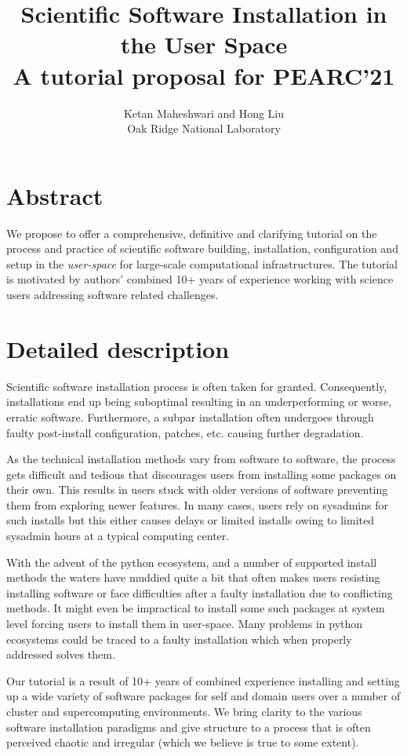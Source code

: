 \documentclass{report}
\title{Scientific Software Installation in the User Space\\
       \large A tutorial proposal for PEARC'21
			 }
\author{Ketan Maheshwari and Hong Liu\\ Oak Ridge National Laboratory}
\begin{document}
\maketitle
\section*{Abstract}
We propose to offer a comprehensive, definitive and clarifying tutorial on the
process and practice of scientific software building, installation,
configuration and setup in the \emph{user-space} for large-scale computational
infrastructures. The tutorial is motivated by authors' combined 10+ years of
experience working with science users addressing software related challenges.

\section*{Detailed description}
Scientific software installation process is often taken for granted.
Consequently, installations end up being suboptimal resulting in an underperforming
or worse, erratic software. Furthermore, a subpar installation often undergoes through faulty
post-install configuration, patches, etc. causing further degradation.

As the technical installation methods vary from software to software, the
process gets difficult and tedious that discourages users from installing some
packages on their own. This results in users stuck with older versions of
software preventing them from exploring newer features. In many cases, users
rely on sysadmins for such installs but this either causes delays or limited
installs owing to limited sysadmin hours at a typical computing center. 

With the advent of the python ecosystem, and a number of supported install methods
the waters have muddied quite a bit that often makes users resisting installing
software or face difficulties after a faulty installation due to conflicting
methods. It might even be impractical to install some such packages at system
level forcing users to install them in user-space. Many problems in python
ecosystems could be traced to a faulty installation which when properly
addressed solves them.

Our tutorial is a result of 10+ years of combined experience installing and
setting up a wide variety of software packages for self and domain users over a
number of cluster and supercomputing environments. We bring clarity to the
various software installation paradigms and give structure to a process that is
often perceived chaotic and irregular (which we believe is true to some
extent).
\end{document}
